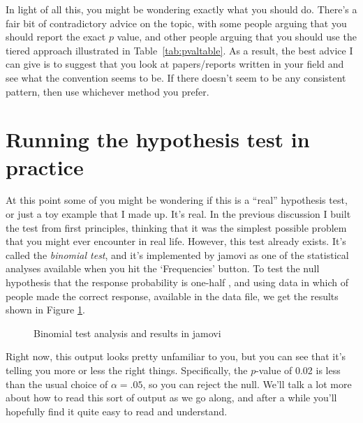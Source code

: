 In light of all this, you might be wondering exactly what you should do. There's a fair bit of contradictory advice on the topic, with some people arguing that you should report the exact $p$ value, and other people arguing that you should use the tiered approach illustrated in Table~\ref{tab:pvaltable}. As a result, the best advice I can give is to suggest that you look at papers/reports written in your field and see what the convention seems to be. If there doesn't seem to be any consistent pattern, then use whichever method you prefer. 


\section{Running the hypothesis test in practice~\label{sec:runhyp}}

At this point some of you might be wondering if this is a ``real'' hypothesis test, or just a toy example that I made up. It's real. In the previous discussion I built the test from first principles, thinking that it was the simplest possible problem that you might ever encounter in real life. However, this test already exists. It's called the {\it binomial test}, and it's implemented by jamovi as one of the statistical analyses available when you hit the `Frequencies' button. To test the null hypothesis that the response probability is one-half , and using data in which  of  people made the correct response, available in the  data file, we get the results shown in Figure \ref{fig:binomialtest}.

\begin{figure}[ht]
\begin{center}
\caption{Binomial test analysis and results in jamovi}
\HR
\label{fig:binomialtest}
\end{center}
\end{figure}

Right now, this output looks pretty unfamiliar to you, but you can see that it's telling you more or less the right things. Specifically, the $p$-value of 0.02 is less than the usual choice of $\alpha = .05$, so you can reject the null. We'll talk a lot more about how to read this sort of output as we go along, and after a while you'll hopefully find it quite easy to read and understand. 


